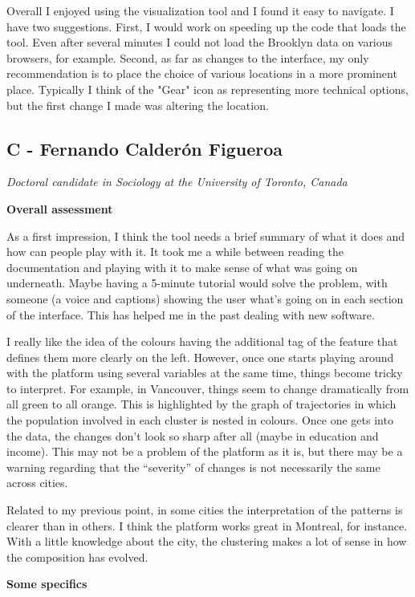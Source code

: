 \documentclass[a4paper]{article}
\begin{document}
Overall I enjoyed using the visualization tool and I found it easy to navigate.
I have two suggestions. First, I would work on speeding up the code that loads
the tool. Even after several minutes I could not load the Brooklyn data on
various browsers, for example. Second, as far as changes to the interface, my
only recommendation is to place the choice of various locations in a more
prominent place. Typically I think of the "Gear" icon as representing more
technical options, but the first change I made was altering the location.

\subsection{C - Fernando Calderón Figueroa}
\emph{Doctoral candidate in Sociology at the University of Toronto, Canada}


\textbf{Overall assessment}

As a first impression, I think the tool needs a brief summary of what it does
and how can people play with it. It took me a while between reading the
documentation and playing with it to make sense of what was going on underneath.
Maybe having a 5-minute tutorial would solve the problem, with someone (a voice
and captions) showing the user what’s going on in each section of the interface.
This has helped me in the past dealing with new software.

I really like the idea of the colours having the additional tag of the feature
that defines them more clearly on the left. However, once one starts playing
around with the platform using several variables at the same time, things become
tricky to interpret. For example, in Vancouver, things seem to change
dramatically from all green to all orange. This is highlighted by the graph of
trajectories in which the population involved in each cluster is nested in
colours. Once one gets into the data, the changes don’t look so sharp after all
(maybe in education and income). This may not be a problem of the platform as it
is, but there may be a warning regarding that the “severity” of changes is not
necessarily the same across cities. 

Related to my previous point, in some cities the interpretation of the patterns
is clearer than in others. I think the platform works great in Montreal, for
instance. With a little knowledge about the city, the clustering makes a lot of
sense in how the composition has evolved. 

\textbf{Some specifics}
\end{document}
